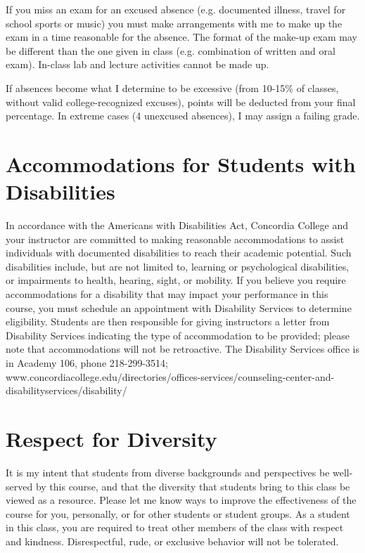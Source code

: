 \documentclass{tufte-handout}
\begin{document}
\begin{fullwidth}
If you miss an exam for an excused absence (e.g. documented illness, travel for school sports or music) you must make arrangements with me to make up the exam in a time reasonable for the absence. The format of the make-up exam may be different than the one given in class (e.g. combination of written and oral exam). In-class lab and lecture activities cannot be made up.

If absences become what I determine to be excessive (from 10-15\% of classes, without valid college-recognized excuses), points will be deducted from your final percentage. In extreme cases (4 unexcused absences), I may assign a failing grade. 

\section{Accommodations for Students with Disabilities}

In accordance with the Americans with Disabilities Act, Concordia College and your instructor are committed to making reasonable accommodations to assist individuals with documented disabilities to reach their academic potential. Such disabilities include, but are not limited to, learning or psychological disabilities, or impairments to health, hearing, sight, or mobility. If you believe you require accommodations for a disability that may impact your performance in this course, you must schedule an appointment with Disability Services to determine eligibility. Students are then responsible for giving instructors a letter from Disability Services indicating the type of accommodation to be provided; please note that accommodations will not be retroactive. The Disability Services office is in Academy 106, phone 218-299-3514; www.concordiacollege.edu/directories/offices-services/counseling-center-and-disabilityservices/disability/ 

\section{Respect for Diversity}

It is my intent that students from diverse backgrounds and perspectives be well-served by this course, and that the diversity that students bring to this class be viewed as a resource. Please let me know ways to improve the effectiveness of the course for you, personally, or for other students or student groups. As a student in this class, you are required to treat other members of the class with respect and kindness. Disrespectful, rude, or exclusive behavior will not be tolerated.

\end{fullwidth}
\end{document}
